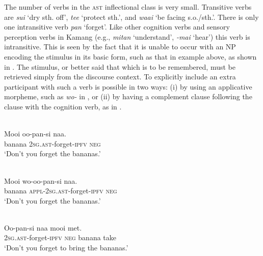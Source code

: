  



The number of verbs in the \textsc{ast} inflectional class is very small. Transitive verbs are \textit{sui} `dry sth. off', \textit{tee} `protect sth.', and \textit{waai} `be facing s.o./sth.'. There is only one intransitive verb \textit{pan} `forget'. Like other cognition verbs and sensory perception verbs in Kamang  (e.g., \textit{mitan} `understand', \textit{{}-mai} `hear') this verb is intransitive. This is seen by the fact that it is unable to occur with an NP encoding the stimulus in its basic form, such as that in example  above, as shown in . The stimulus, or better said that which is to be remembered, must be retrieved simply from the discourse context. To explicitly include an extra participant with such a verb is possible in two ways: (i) by using an applicative morpheme, such as \textit{wo-} in , or (ii) by having a complement clause following the clause with the cognition verb, as in . 


\ea%
\label{bkm:Ref372879210}
 \\ 
\gll * Mooi  oo-pan-si  naa.\\  
     {} banana  \textsc{2sg.ast}{}-forget-\textsc{ipfv} \textsc{neg}  \\
\glt  `Don't you forget the bananas.'
\z



 



\ea%
\label{bkm:Ref372879221}
 \\ 
\gll    Mooi  wo-oo-pan-si  naa.\\  
  banana  \textsc{appl-2sg.ast}{}-forget-\textsc{ipfv} \textsc{neg}  \\
\glt`Don't you forget the bananas.'
\z



  

  

\ea%
\label{bkm:Ref372879227}
 \\ 
\gll  Oo-pan-si  naa  mooi  met. \\  
    \textsc{2sg.ast}{}-forget-\textsc{ipfv} \textsc{neg}  banana  take \\
\glt  `Don't you forget to bring the bananas.'
\z

